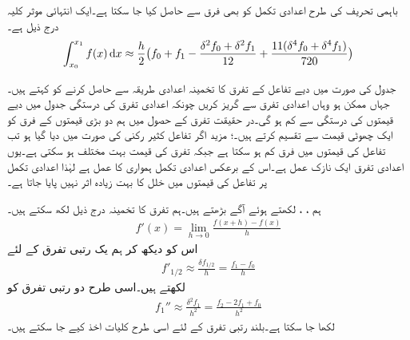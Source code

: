 باہمی تحریف کی طرح اعدادی تکمل کو بھی فرق سے حاصل کیا جا سکتا ہے۔ایک انتہائی موثر کلیہ درج ذیل   ہے۔
\begin{align}
\int_{x_0}^{x_1}f(x)\dif x\approx \frac{h}{2}\big(f_0+f_1-\frac{\delta^2 f_0+\delta^2f_1}{12}+\frac{11(\delta^4f_0+\delta^4f_1)}{720}\big)
\end{align}

جدول کی صورت میں دیے تفاعل کے تفرق کا تخمینہ اعدادی طریقہ  سے حاصل کرنے  کو  کہتے ہیں۔ جہاں ممکن ہو وہاں اعدادی تفرق سے گریز کریں چونکہ اعدادی تفرق کی درستگی  جدول میں دیے قیمتوں کی درستگی سے کم ہو گی۔در حقیقت تفرق کے حصول میں ہم دو بڑی قیمتوں کے فرق کو ایک چھوٹی قیمت سے تقسیم کرتے ہیں۔؛ مزید اگر تفاعل کثیر رکنی  کی صورت میں دیا گیا ہو تب تفاعل کی قیمتوں میں فرق کم ہو سکتا ہے جبکہ تفرق کی قیمت بہت مختلف ہو سکتی ہے۔یوں اعدادی تفرق ایک نازک عمل ہے۔اس کے برعکس اعدادی تکمل ہمواری کا عمل ہے لہٰذا اعدادی تکمل  پر تفاعل کی قیمتوں میں خلل کا بہت زیادہ اثر نہیں پایا جاتا ہے۔

ہم ، ،  لکھتے ہوئے آگے بڑھتے ہیں۔ہم تفرق کا تخمینہ درج ذیل لکھ سکتے ہیں۔
\begin{align*}
f'(x)=\lim_{h\to 0}\frac{f(x+h)-f(x)}{h}
\end{align*}
اس کو دیکھ کر ہم یک رتبی تفرق کے لئے
\begin{align}\label{مساوات_اعدادی_تفرق_کلیہ_الف}
f'_{1/2}\approx \frac{\delta f_{1/2}}{h}=\frac{f_1-f_0}{h}
\end{align}
لکھتے ہیں۔اسی طرح دو رتبی تفرق کو
\begin{align}\label{مساوات_اعدادی_تفرق_کلیہ_ب}
f_1''\approx \frac{\delta^2 f_1}{h^2}=\frac{f_2-2f_1+f_0}{h^2}
\end{align}
لکھا جا سکتا ہے۔بلند رتبی تفرق کے لئے اسی طرح کلیات اخذ کیے جا سکتے ہیں۔


